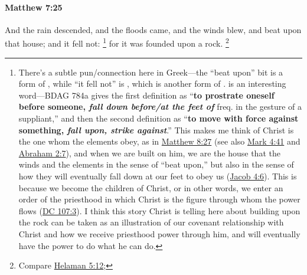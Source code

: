 		\paragraph{Matthew 7:25} %
			\label{MATTHEW-7-25}

			And the rain descended, and the floods came, and the winds blew, and beat upon that house; and it fell not:%
				\footnote{%
					There's a subtle pun/connection here in Greek---the ``beat upon'' bit is a form of , while ``it fell not'' is , which is another form of .  is an interesting word---BDAG 784a gives the first definition as ``\textbf{to prostrate oneself before someone, \textit{fall down before/at the feet of}} freq. in the gesture of a suppliant,'' and then the second definition as ``\textbf{to move with force against something, \textit{fall upon, strike against}}.'' This makes me think of Christ is the one whom the elements obey, as in \hyperref[MATTHEW-8-27]{Matthew 8:27} (see also \hyperref[MARK-4-41]{Mark 4:41} and \hyperref[ABRAHAM-2-7]{Abraham 2:7}), and when we are built on him, we are the house that the winds and the elements  in the sense of ``beat upon,'' but also  in the sense of how they will eventually fall down at our feet to obey us (\hyperref[JACOB-4-6]{Jacob 4:6}). This is because we become the children of Christ, or in other words, we enter an order of the priesthood in which Christ is the figure through whom the power flows (\hyperref[DC107-3]{DC 107:3}). I think this story Christ is telling here about building upon the rock can be taken as an illustration of our covenant relationship with Christ and how we receive priesthood power through him, and will eventually have the power to do what he can do.
					}
			for it was founded upon a rock.%
				\footnote{%
					Compare \hyperref[HELAMAN-5-12]{Helaman 5:12}; 
					}

			\begin{framed}
			\scriptsize
				\begin{compactdesc}
					\item[SBLG] 
				\end{compactdesc}
			\end{framed}

